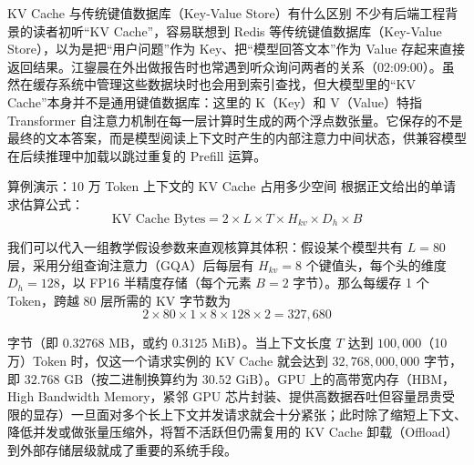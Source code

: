 \documentclass[UTF8,a4paper,11pt,fontset=fandol]{ctexart}
\begin{document}
\begin{warningbox}{KV Cache 与传统键值数据库（Key-Value Store）有什么区别}
不少有后端工程背景的读者初听“KV Cache”，容易联想到 Redis 等传统键值数据库（Key-Value Store），以为是把“用户问题”作为 Key、把“模型回答文本”作为 Value 存起来直接返回结果。江鋆晨在外出做报告时也常遇到听众询问两者的关系（02:09:00）。虽然在缓存系统中管理这些数据块时也会用到索引查找，但大模型里的“KV Cache”本身并不是通用键值数据库：这里的 K（Key）和 V（Value）特指 Transformer 自注意力机制在每一层计算时生成的两个浮点数张量。它保存的不是最终的文本答案，而是模型阅读上下文时产生的内部注意力中间状态，供兼容模型在后续推理中加载以跳过重复的 Prefill 运算。
\end{warningbox}
\begin{knowledgebox}{算例演示：10 万 Token 上下文的 KV Cache 占用多少空间}
根据正文给出的单请求估算公式：
\[
\text{KV Cache Bytes} = 2 \times L \times T \times H_{kv} \times D_h \times B
\]

我们可以代入一组教学假设参数来直观核算其体积：假设某个模型共有 \(L=80\) 层，采用分组查询注意力（GQA）后每层有 \(H_{kv}=8\) 个键值头，每个头的维度 \(D_h=128\)，以 FP16 半精度存储（每个元素 \(B=2\) 字节）。那么每缓存 1 个 Token，跨越 80 层所需的 KV 字节数为
\[
2 \times 80 \times 1 \times 8 \times 128 \times 2 = 327,680
\]

字节（即 \(0.32768\text{ MB}\)，或约 \(0.3125\text{ MiB}\)）。当上下文长度 \(T\) 达到 \(100,000\)（10 万）Token 时，仅这一个请求实例的 KV Cache 就会达到 \(32,768,000,000\) 字节，即 \(32.768\text{ GB}\)（按二进制换算约为 \(30.52\text{ GiB}\)）。GPU 上的高带宽内存（HBM，High Bandwidth Memory，紧邻 GPU 芯片封装、提供高数据吞吐但容量昂贵受限的显存）一旦面对多个长上下文并发请求就会十分紧张；此时除了缩短上下文、降低并发或做张量压缩外，将暂不活跃但仍需复用的 KV Cache 卸载（Offload）到外部存储层级就成了重要的系统手段。
\end{knowledgebox}
\end{document}
